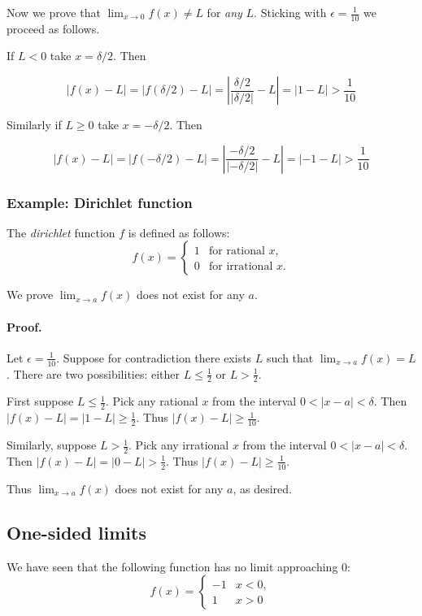 Now we prove that $\lim_{x\to 0}f(x)\neq L$ for \textit{any} $L$. Sticking
with $\epsilon=\frac{1}{10}$ we proceed as follows.

\vs

If $L<0$ take $x=\delta/2$. Then

\[|f(x)-L|=|f(\delta/2)-L|=\left|\frac{\delta/2}{|\delta/2|}-L\right|=|1-L|>\frac{1}{10}\]

Similarly if $L\geq 0$ take $x=-\delta/2$. Then

\[|f(x)-L|=|f(-\delta/2)-L|=\left|\frac{-\delta/2}{|-\delta/2|}-L\right|=|-1-L|>\frac{1}{10}\]

\subsubsection*{Example: Dirichlet function} \label{subsubsec:dirichlet}
The \textit{dirichlet} function $f$ is defined as follows:
\[
f(x) = 
\begin{cases} 
1 & \text{for rational } x,\\
0 & \text{for irrational } x.
\end{cases}
\]

We prove $\lim_{x\to a}f(x)$ does not exist for any $a$.

\paragraph{Proof.} Let $\epsilon=\frac{1}{10}$. Suppose for contradiction
there exists $L$ such that $\lim_{x\to a}f(x)=L$. There are two
possibilities: either $L\leq\frac{1}{2}$ or $L>\frac{1}{2}$.

\vs

First suppose $L\leq\frac{1}{2}$. Pick any rational $x$ from the interval
$0<|x-a|<\delta$. Then $|f(x)-L|=|1-L|\geq\frac{1}{2}$. Thus
$|f(x)-L|\geq\frac{1}{10}$.

\vs

Similarly, suppose $L>\frac{1}{2}$. Pick any irrational $x$ from the
interval $0<|x-a|<\delta$. Then $|f(x)-L|=|0-L|>\frac{1}{2}$. Thus
$|f(x)-L|\geq\frac{1}{10}$.

\vs

Thus $\lim_{x\to a}f(x)$ does not exist for any $a$, as desired.

\subsection{One-sided limits}
We have seen that the following function has no limit approaching $0$:
\[
f(x) = 
\begin{cases} 
-1 & x<0,\\
1 & x>0
\end{cases}
\]

